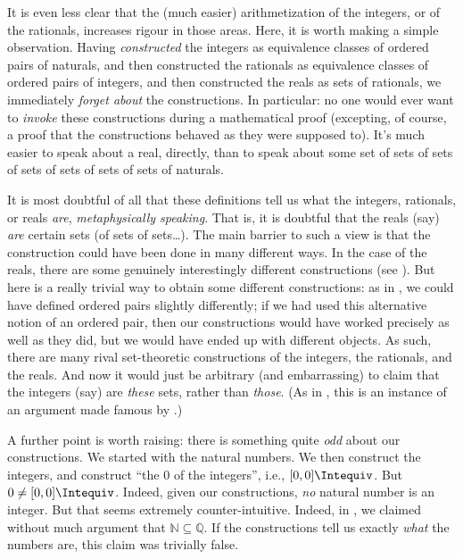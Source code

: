 \documentclass[10pt,a4paper]{article}
\makeatletter
\theoremstyle{plain}
\theoremstyle{definition}
\theoremstyle{remark}
\newcommand{\olref}{\@ifnextchar[{\olref@i}{\olref@final}}
\def\olref@i[#1]{\@ifnextchar[{\olref@ii}{\olref@final}}
\def\olref@ii[#1]{\@ifnextchar[{\olref@iii}{\olref@final}}
\def\olref@iii[#1]{\olref@final}
\def\olref@final#1{\ref{#1}}
\providecommand{\Nat}{\ensuremath{\mathbb{N}}}
\providecommand{\equivrep}[1]{[#1]}
\providecommand{\Rat}{\mathbb{Q}}
\makeatother
\begin{document}
It is even less clear that the (much easier) arithmetization of the
integers, or of the rationals, increases rigour in those areas. Here,
it is worth making a simple observation. Having \emph{constructed} the
integers as equivalence classes of ordered pairs of naturals, and then
constructed the rationals as equivalence classes of ordered pairs of
integers, and then constructed the reals as sets of rationals, we
immediately \emph{forget about} the constructions. In particular: no
one would ever want to \emph{invoke} these constructions during a
mathematical proof (excepting, of course, a proof that the
constructions behaved as they were supposed to). It's much easier to
speak about a real, directly, than to speak about some set of sets of
sets of sets of sets of sets of sets of naturals. 
%
%
%
	
It is most doubtful of all that these definitions tell us what the
integers, rationals, or reals \emph{are}, \emph{metaphysically
speaking}. That is, it is doubtful that the reals (say) \emph{are}
certain sets (of sets of sets\ldots). The main barrier to such a view
is that the construction could have been done in many different ways.
In the case of the reals, there are some genuinely interestingly
different constructions (see \olref[cauchy]{sec}). But here is a
really trivial way to obtain some different constructions: as in
\olref[sfr][rel][ref]{sec}, we could have defined ordered pairs
slightly differently; if we had used this alternative notion of an
ordered pair, then our constructions would have worked precisely as
well as they did, but we would have ended up with different objects.
As such, there are many rival set-theoretic constructions of the
integers, the rationals, and the reals. And now it would just be
arbitrary (and embarrassing) to claim that the integers (say) are
\emph{these} sets, rather than \emph{those}. (As in
\olref[sfr][rel][ref]{sec}, this is an instance of an argument made
famous by \citealt{Benacerraf1965}.)

A further point is worth raising: there is something quite \emph{odd}
about our constructions. We started with the natural numbers. We then
construct the integers, and construct ``the $0$ of the integers'',
i.e., $ \equivrep{0,0}{\Intequiv}$. But $0 \neq
\equivrep{0,0}{\Intequiv}$. Indeed,  given our constructions,
\emph{no} natural number is an integer. But that seems extremely
counter-intuitive. Indeed, in \olref[sfr][set][imp]{sec}, we claimed
without much argument that $\Nat \subseteq \Rat$. If the constructions
tell us exactly \emph{what} the numbers are, this claim was trivially
false. 
\end{document}

